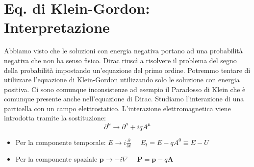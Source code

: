 \section{Eq. di Klein-Gordon: Interpretazione}
Abbiamo visto che le soluzioni con energia negativa portano ad una probabilità negativa che non ha senso fisico. Dirac riuscì a risolvere il problema del segno della probabilità impostando un'equazione del primo ordine. Potremmo tentare di utilizzare l'equazione di Klein-Gordon utilizzando solo le soluzione con energia positiva. Ci sono comunque inconsistenze ad esempio il Paradosso di Klein che è comunque presente anche nell'equazione di Dirac. Studiamo l'interazione di una particella con un campo elettrostatico. L'interazione elettromagnetica viene introdotta tramite la sostituzione:
\begin{equation*}
    \partial^\mu\to\partial^\mu+iqA^\mu
\end{equation*}
\begin{itemize}
    \item Per la componente temporale: $E\to i\frac{\partial}{\partial t}$ $\quad E_t=E-qA^0\equiv E-U$
    \item Per la componente spaziale $\mathbf{p}\to-i\nabla$ $\quad\mathbf{P}=\mathbf{p}-q\mathbf{A}$
\end{itemize}
